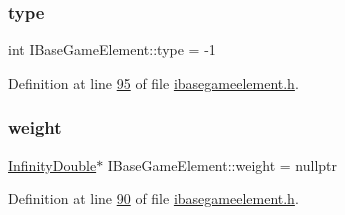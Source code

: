 \subsubsection{\texorpdfstring{type}{type}}
{\footnotesize\ttfamily int I\+Base\+Game\+Element\+::type = -\/1\hspace{0.3cm}{\ttfamily [protected]}}



Definition at line \hyperlink{a00047_source_l00095}{95} of file \hyperlink{a00047_source}{ibasegameelement.\+h}.

\mbox{\label{a00137_a99901016531fd27b9b197dc88d3bfa4a}} 
\subsubsection{\texorpdfstring{weight}{weight}}
{\footnotesize\ttfamily \hyperlink{a00161}{Infinity\+Double}$\ast$ I\+Base\+Game\+Element\+::weight = nullptr\hspace{0.3cm}{\ttfamily [protected]}}



Definition at line \hyperlink{a00047_source_l00090}{90} of file \hyperlink{a00047_source}{ibasegameelement.\+h}.

